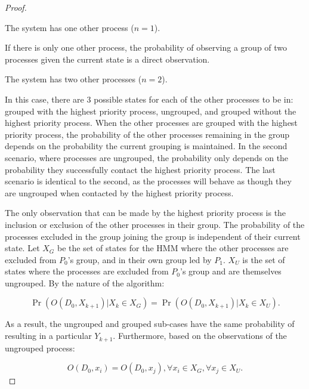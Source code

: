 \begin{proof}
\begin{case}
    The system has one other process ($n=1$).
\end{case}

If there is only one other process, the probability of observing a group of two processes given the current state is a direct observation.

\begin{case}
    The system has two other processes ($n=2$).
\end{case}

In this case, there are 3 possible states for each of the other processes to be in: grouped with the highest priority process, ungrouped, and grouped without the highest priority process.
When the other processes are grouped with the highest priority process, the probability of the other processes remaining in the group depends on the probability the current grouping is maintained.
In the second scenario, where processes are ungrouped, the probability only depends on the probability they successfully contact the highest priority process.
The last scenario is identical to the second, as the processes will behave as though they are ungrouped when contacted by the highest priority process.

The only observation that can be made by the highest priority process is the inclusion or exclusion of the other processes in their group.
The probability of the processes excluded in the group joining the group is independent of their current state.
Let $X_G$ be the set of states for the \ac{HMM} where the other processes are excluded from $P_0$'s group, and in their own group led by $P_1$.
$X_U$ is the set of states where the processes are excluded from $P_0$'s group and are themselves ungrouped.
By the nature of the algorithm: 

\begin{equation}
\Pr(O(D_0, X_{k+1}) | X_k \in X_G) = \Pr(O(D_0, X_{k+1}) | X_k \in X_U).
\label{eq:sameprob}
\end{equation}

As a result, the ungrouped and grouped sub-cases have the same probability of resulting in a particular $Y_{k+1}$.
Furthermore, based on the observations of the ungrouped process:

\begin{equation}
O(D_0, x_i) = O(D_0, x_j), \forall x_i \in X_G, \forall x_j \in X_U.
\end{equation}


\end{proof}
